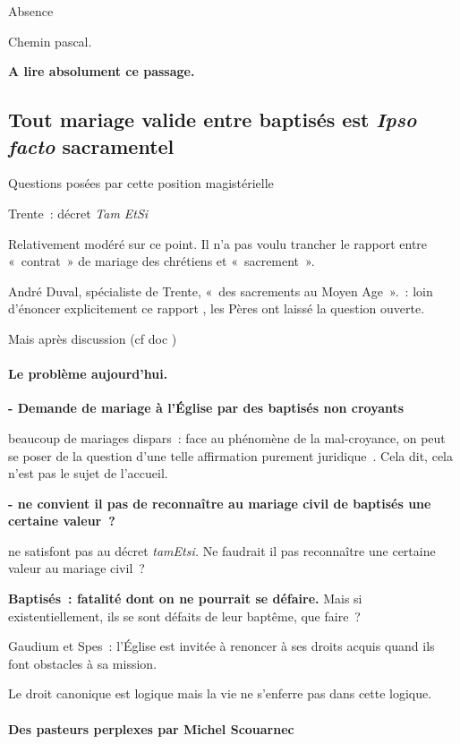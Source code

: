 Absence

Chemin pascal.

\textbf{A lire absolument ce passage.}


\subsection{Tout mariage valide entre baptisés est
\emph{Ipso facto}
sacramentel}

Questions posées par cette position magistérielle

Trente~: décret \emph{Tam EtSi}

Relativement modéré sur ce point. Il n'a pas voulu trancher le rapport
entre «~contrat~» de mariage des chrétiens et «~sacrement~».

André Duval, spécialiste de Trente, «~des sacrements au Moyen Age~».~:
loin d'énoncer explicitement ce rapport , les Pères ont laissé la
question ouverte.

Mais après discussion (cf doc )

\hypertarget{le-probluxe8me-aujourdhui.}{%
\paragraph{Le problème
aujourd'hui.}\label{le-probluxe8me-aujourdhui.}}

\textbf{- Demande de mariage à l'Église par des baptisés non croyants}

beaucoup de mariages dispars~: face au phénomène de la mal-croyance, on
peut se poser de la question d'une telle affirmation purement
juridique~. Cela dit, cela n'est pas le sujet de l'accueil.

\textbf{- ne convient il pas de reconnaître au mariage civil de baptisés
une certaine valeur~?}

ne satisfont pas au décret \emph{tamEtsi.} Ne faudrait il pas
reconnaître une certaine valeur au mariage civil~?

\textbf{Baptisés~: fatalité dont on ne pourrait se défaire.} Mais si
existentiellement, ils se sont défaits de leur baptême, que faire~?

Gaudium et Spes~: l'Église est invitée à renoncer à ses droits acquis
quand ils font obstacles à sa mission.

Le droit canonique est logique mais la vie ne s'enferre pas dans cette
logique.

\hypertarget{des-pasteurs-perplexes-par-michel-scouarnec}{%
\paragraph{Des pasteurs perplexes par Michel
Scouarnec}\label{des-pasteurs-perplexes-par-michel-scouarnec}}

